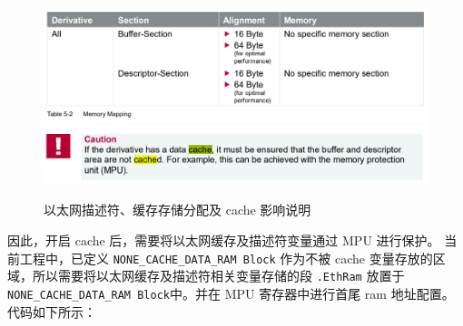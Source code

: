 \begin{figure}[htbp]
    \centering
    \includegraphics[scale=0.8]{pic/Snipaste_2021-11-05_13-10-08.png}
    \includegraphics[scale=0.8]{pic/Snipaste_2021-11-05_13-10-26.png}
    \caption{以太网描述符、缓存存储分配及 cache 影响说明}
    \label{fig:desc_buffer_cache}
\end{figure}

因此，开启 cache 后，需要将以太网缓存及描述符变量通过 MPU 进行保护。
当前工程中，已定义 \lstinline{NONE_CACHE_DATA_RAM Block} 作为不被 cache 变量存放的区域，所以需要将以太网缓存及描述符相关变量存储的段
\lstinline{.EthRam} 放置于 \lstinline{NONE_CACHE_DATA_RAM Block}中。并在 MPU 寄存器中进行首尾 ram 地址配置。代码如下所示：


